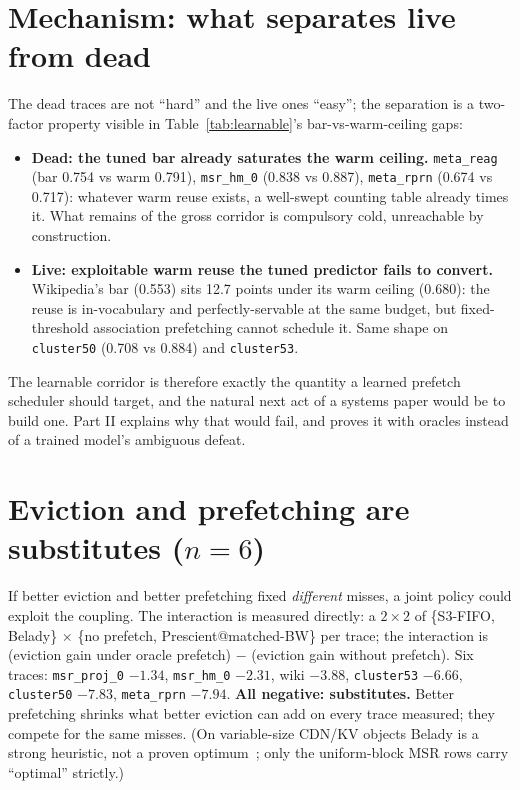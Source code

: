 \documentclass[11pt]{article}
\begin{document}
\section{Mechanism: what separates live from dead}\label{sec:mechanism}
The dead traces are not ``hard'' and the live ones ``easy''; the separation is a two-factor property visible in Table~\ref{tab:learnable}'s bar-vs-warm-ceiling gaps:
\begin{itemize}\itemsep0.1em
\item \textbf{Dead: the tuned bar already saturates the warm ceiling.} \texttt{meta\_reag} (bar 0.754 vs warm 0.791), \texttt{msr\_hm\_0} (0.838 vs 0.887), \texttt{meta\_rprn} (0.674 vs 0.717): whatever warm reuse exists, a well-swept counting table already times it. What remains of the gross corridor is compulsory cold, unreachable by construction.
\item \textbf{Live: exploitable warm reuse the tuned predictor fails to convert.} Wikipedia's bar (0.553) sits 12.7 points under its warm ceiling (0.680): the reuse is in-vocabulary and perfectly-servable at the same budget, but fixed-threshold association prefetching cannot schedule it. Same shape on \texttt{cluster50} (0.708 vs 0.884) and \texttt{cluster53}.
\end{itemize}
The learnable corridor is therefore exactly the quantity a learned prefetch scheduler should target, and the natural next act of a systems paper would be to build one. Part II explains why that would fail, and proves it with oracles instead of a trained model's ambiguous defeat.

\section{Eviction and prefetching are substitutes ($n{=}6$)}\label{sec:substitutes}
If better eviction and better prefetching fixed \emph{different} misses, a joint policy could exploit the coupling. The interaction is measured directly: a $2\times2$ of \{S3-FIFO, Belady\} $\times$ \{no prefetch, Prescient@matched-BW\} per trace; the interaction is (eviction gain under oracle prefetch) $-$ (eviction gain without prefetch). Six traces: \texttt{msr\_proj\_0} $-1.34$, \texttt{msr\_hm\_0} $-2.31$, wiki $-3.88$, \texttt{cluster53} $-6.66$, \texttt{cluster50} $-7.83$, \texttt{meta\_rprn} $-7.94$. \textbf{All negative: substitutes.} Better prefetching shrinks what better eviction can add on every trace measured; they compete for the same misses. (On variable-size CDN/KV objects Belady is a strong heuristic, not a proven optimum~\cite{demandmin}; only the uniform-block MSR rows carry ``optimal'' strictly.)
\end{document}
